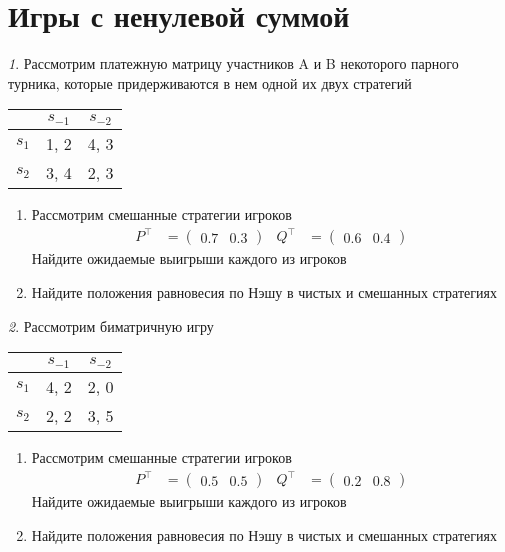 \documentclass[12pt]{article}
\theoremstyle{remark}
\newtheorem{exercise}{}[subsection]
\begin{document}
\section{Игры с ненулевой суммой}

\begin{exercise}
Рассмотрим платежную матрицу участников A и B некоторого парного турника,
которые придерживаются в нем одной их двух стратегий
\begin{center}
	\begin{tabular}{|c||c|c|}
	\hline
	& $s_{-1}$ & $s_{-2}$  \\ \hline \hline
	$s_1$ & 1, 2 & 4, 3  \\ \hline
	$s_2$ & 3, 4 & 2, 3  \\ %
	\hline
	\end{tabular}
\end{center}
\begin{enumerate}
	\item Рассмотрим  смешанные стратегии игроков 
	\begin{align*}
		P^\top&=\begin{pmatrix} 0.7 & 0.3 \end{pmatrix} &
		Q^\top&=\begin{pmatrix} 0.6 & 0.4 \end{pmatrix}
	\end{align*}
	Найдите ожидаемые выигрыши каждого из игроков
	\item Найдите положения равновесия по Нэшу в чистых и смешанных стратегиях
\end{enumerate}
\end{exercise}

\begin{exercise}
Рассмотрим биматричную игру
\begin{center}
	\begin{tabular}{|c||c|c|}
	\hline
	& $s_{-1}$ & $s_{-2}$  \\ \hline \hline
	$s_1$ & 4, 2 & 2, 0  \\ \hline
	$s_2$ & 2, 2 & 3, 5  \\ %
	\hline
	\end{tabular}
\end{center}
\begin{enumerate}
	\item Рассмотрим смешанные стратегии игроков 
	\begin{align*}
		P^\top&=\begin{pmatrix} 0.5 & 0.5 \end{pmatrix} &
		Q^\top&=\begin{pmatrix} 0.2 & 0.8 \end{pmatrix}
	\end{align*}
	Найдите ожидаемые выигрыши каждого из игроков
	\item Найдите положения равновесия по Нэшу в чистых и смешанных стратегиях
\end{enumerate}
\end{exercise}
\end{document}
